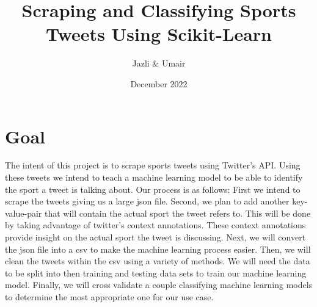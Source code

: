 \documentclass{article}
\title{Scraping and Classifying Sports Tweets Using Scikit-Learn}
\author{Jazli \& Umair}
\date{December 2022}
\begin{document}
\maketitle
\section{Goal}
The intent of this project is to scrape sports tweets using Twitter's API. Using these tweets we intend to teach a machine learning model to be able to identify the sport a tweet is talking about. Our process is as follows: First we intend to scrape the tweets giving us a large json file. Second, we plan to add another key-value-pair that will contain the actual sport the tweet refers to. This will be done by taking advantage of twitter's context annotations. These context annotations provide insight on the actual sport the tweet is discussing. Next, we will convert the json file into a csv to make the machine learning process easier. Then, we will clean the tweets within the csv using a variety of methods. We will need the data to be split into then training and testing data sets to train our machine learning model. Finally, we will cross validate a couple classifying machine learning models to determine the most appropriate one for our use case.
\end{document}
